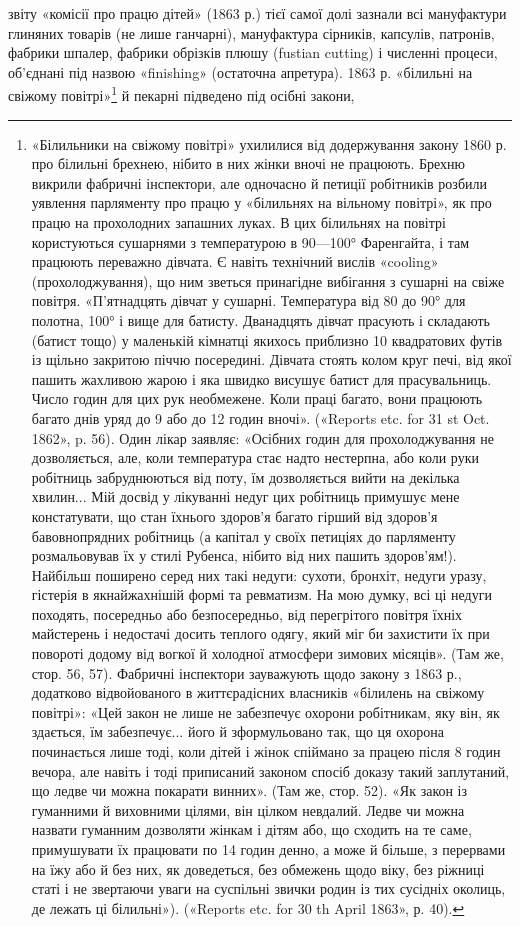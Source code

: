 \parcont{}  %
звіту «комісії про працю дітей» (1863 р.) тієї самої долі зазнали
всі мануфактури глиняних товарів (не лише ганчарні), мануфактура
сірників, капсулів, патронів, фабрики шпалер, фабрики
обрізків плюшу (fustian cutting) і численні процеси, об’єднані
під назвою «finishing» (остаточна апретура). 1863 р. «білильні
на свіжому повітрі»\footnote{
«Білильники на свіжому повітрі» ухилилися від додержування
закону 1860 р. про білильні брехнею, нібито в них жінки вночі не працюють.
Брехню викрили фабричні інспектори, але одночасно й петиції
робітників розбили уявлення парляменту про працю у «білильнях на
вільному повітрі», як про працю на прохолодних запашних луках. В цих
білильнях на повітрі користуються сушарнями з температурою в 90—100°
Фаренгайта, і там працюють переважно дівчата. Є навіть технічний вислів
«cooling» (прохолоджування), що ним зветься принагідне вибігання з
сушарні на свіже повітря. «П’ятнадцять дівчат у сушарні. Температура
від 80 до 90° для полотна, 100° і вище для батисту. Дванадцять дівчат прасують
і складають (батист тощо) у маленькій кімнатці якихось приблизно
10 квадратових футів із щільно закритою піччю посередині. Дівчата стоять
колом круг печі, від якої пашить жахливою жарою і яка швидко висушує
батист для прасувальниць. Число годин для цих рук необмежене. Коли
праці багато, вони працюють багато днів уряд до 9 або до 12 годин вночі».
(«Reports etc. for 31 st Oct. 1862», p. 56). Один лікар заявляє: «Осібних
годин для прохолоджування не дозволяється, але, коли температура стає
надто нестерпна, або коли руки робітниць забруднюються від поту, їм
дозволяється вийти на декілька хвилин... Мій досвід у лікуванні недуг
цих робітниць примушує мене констатувати, що стан їхнього здоров'я
багато гірший від здоров’я бавовнопрядних робітниць (а капітал у своїх
петиціях до парляменту розмальовував їх у стилі Рубенса, нібито від них
пашить здоров’ям!). Найбільш поширено серед них такі недуги: сухоти,
бронхіт, недуги уразу, гістерія в якнайжахнішій формі та ревматизм.
На мою думку, всі ці недуги походять, посередньо або безпосередньо,
від перегрітого повітря їхніх майстерень і недостачі досить теплого одягу,
який міг би захистити їх при повороті додому від вогкої й холодної атмосфери
зимових місяців». (Там же, стор. 56, 57). Фабричні інспектори зауважують
щодо закону з 1863 р., додатково відвойованого в життєрадісних
власників «білилень на свіжому повітрі»: «Цей закон не лише не забезпечує
охорони робітникам, яку він, як здається, їм забезпечує... його й
зформульовано так, що ця охорона починається лише тоді, коли дітей
і жінок спіймано за працею після 8 годин вечора, але навіть і тоді приписаний
законом спосіб доказу такий заплутаний, що ледве чи можна
покарати винних». (Там же, стор. 52). «Як закон із гуманними й виховними
цілями, він цілком невдалий. Ледве чи можна назвати гуманним
дозволяти жінкам і дітям або, що сходить на те саме, примушувати їх
працювати по 14 годин денно, а може й більше, з перервами на їжу або
й без них, як доведеться, без обмежень щодо віку, без ріжниці статі
і не звертаючи уваги на суспільні звички родин із тих сусідніх околиць,
де лежать ці білильні»). («Reports etc. for 30 th April 1863», р. 40).
} й пекарні підведено під осібні закони,
